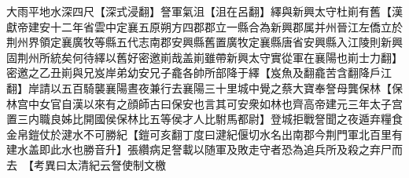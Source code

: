 大雨平地水深四尺【深式浸翻】詧軍氣沮【沮在呂翻】繹與新興太守杜崱有舊【漢獻帝建安十二年省雲中定襄五原朔方四郡郡立一縣合為新興郡属并州晉江左僑立於荆州界領定襄廣牧等縣五代志南郡安興縣舊置廣牧定襄縣唐省安興縣入江陵則新興固荆州所統矣何待繹以舊好密邀崱哉盖崱雖帶新興太守實從軍在襄陽也崱士力翻】密邀之乙丑崱與兄岌岸弟幼安兄子龕各帥所部降于繹【岌魚及翻龕苦含翻降戶江翻】岸請以五百騎襲襄陽晝夜兼行去襄陽三十里城中覺之蔡大寶奉詧母龔保林【保林宫中女官自漢以來有之顔師古曰保安也言其可安衆如林也齊高帝建元三年太子宫置三内職良姊比開國侯保林比五等侯才人比駙馬都尉】登城拒戰詧聞之夜遁弃糧食金帛鎧仗於湕水不可勝紀【鎧可亥翻丁度曰湕紀偃切水名出南郡今荆門軍北百里有建水盖即此水也勝音升】張纘病足詧載以随軍及敗走守者恐為追兵所及殺之弃尸而去　【考異曰太清紀云詧使制文檄
